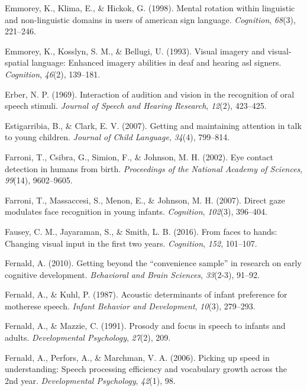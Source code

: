 \documentclass[oneside]{report}
\begin{document}
\hypertarget{ref-emmorey1998mental}{}
Emmorey, K., Klima, E., \& Hickok, G. (1998). Mental rotation within
linguistic and non-linguistic domains in users of american sign
language. \emph{Cognition}, \emph{68}(3), 221--246.

\hypertarget{ref-emmorey1993visual}{}
Emmorey, K., Kosslyn, S. M., \& Bellugi, U. (1993). Visual imagery and
visual-spatial language: Enhanced imagery abilities in deaf and hearing
asl signers. \emph{Cognition}, \emph{46}(2), 139--181.

\hypertarget{ref-erber1969interaction}{}
Erber, N. P. (1969). Interaction of audition and vision in the
recognition of oral speech stimuli. \emph{Journal of Speech and Hearing
Research}, \emph{12}(2), 423--425.

\hypertarget{ref-estigarribia2007getting}{}
Estigarribia, B., \& Clark, E. V. (2007). Getting and maintaining
attention in talk to young children. \emph{Journal of Child Language},
\emph{34}(4), 799--814.

\hypertarget{ref-farroni2002eye}{}
Farroni, T., Csibra, G., Simion, F., \& Johnson, M. H. (2002). Eye
contact detection in humans from birth. \emph{Proceedings of the
National Academy of Sciences}, \emph{99}(14), 9602--9605.

\hypertarget{ref-farroni2007direct}{}
Farroni, T., Massaccesi, S., Menon, E., \& Johnson, M. H. (2007). Direct
gaze modulates face recognition in young infants. \emph{Cognition},
\emph{102}(3), 396--404.

\hypertarget{ref-fausey2016faces}{}
Fausey, C. M., Jayaraman, S., \& Smith, L. B. (2016). From faces to
hands: Changing visual input in the first two years. \emph{Cognition},
\emph{152}, 101--107.

\hypertarget{ref-fernald2010getting}{}
Fernald, A. (2010). Getting beyond the ``convenience sample'' in
research on early cognitive development. \emph{Behavioral and Brain
Sciences}, \emph{33}(2-3), 91--92.

\hypertarget{ref-fernald1987acoustic}{}
Fernald, A., \& Kuhl, P. (1987). Acoustic determinants of infant
preference for motherese speech. \emph{Infant Behavior and Development},
\emph{10}(3), 279--293.

\hypertarget{ref-fernald1991prosody}{}
Fernald, A., \& Mazzie, C. (1991). Prosody and focus in speech to
infants and adults. \emph{Developmental Psychology}, \emph{27}(2), 209.

\hypertarget{ref-fernald2006picking}{}
Fernald, A., Perfors, A., \& Marchman, V. A. (2006). Picking up speed in
understanding: Speech processing efficiency and vocabulary growth across
the 2nd year. \emph{Developmental Psychology}, \emph{42}(1), 98.
\end{document}
